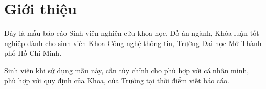 \chapter{Giới thiệu}
\label{Chapter1}
Đây là mẫu báo cáo Sinh viên nghiên cứu khoa học, Đồ án ngành, Khóa luận tốt nghiệp dành cho sinh viên Khoa Công nghệ thông tin, Trường Đại học Mở Thành phố Hồ Chí Minh.

Sinh viên khi sử dụng mẫu này, cần tùy chỉnh cho phù hợp với cá nhân mình, phù hợp với quy định của Khoa, của Trường tại thời điểm viết báo cáo.
